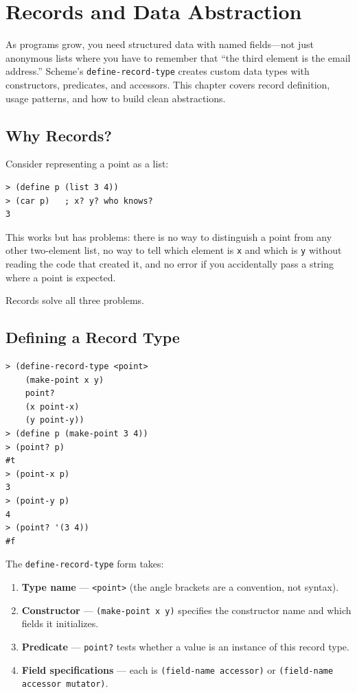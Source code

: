 \chapter{Records and Data Abstraction}
\label{ch:records}

As programs grow, you need structured data with named fields---not just anonymous lists where you have to remember that ``the third element is the email address.'' Scheme's \texttt{define-record-type} creates custom data types with constructors, predicates, and accessors. This chapter covers record definition, usage patterns, and how to build clean abstractions.

\section{Why Records?}

Consider representing a point as a list:

\begin{lstlisting}[style=repl]
> (define p (list 3 4))
> (car p)   ; x? y? who knows?
3
\end{lstlisting}

This works but has problems: there is no way to distinguish a point from any other two-element list, no way to tell which element is \texttt{x} and which is \texttt{y} without reading the code that created it, and no error if you accidentally pass a string where a point is expected.

Records solve all three problems.

\section{Defining a Record Type}

\begin{lstlisting}[style=repl]
> (define-record-type <point>
    (make-point x y)
    point?
    (x point-x)
    (y point-y))
> (define p (make-point 3 4))
> (point? p)
#t
> (point-x p)
3
> (point-y p)
4
> (point? '(3 4))
#f
\end{lstlisting}

The \texttt{define-record-type} form takes:

\begin{enumerate}
    \item \textbf{Type name} --- \texttt{<point>} (the angle brackets are a convention, not syntax).
    \item \textbf{Constructor} --- \texttt{(make-point x y)} specifies the constructor name and which fields it initializes.
    \item \textbf{Predicate} --- \texttt{point?} tests whether a value is an instance of this record type.
    \item \textbf{Field specifications} --- each is \texttt{(field-name accessor)} or \texttt{(field-name accessor mutator)}.
\end{enumerate}

